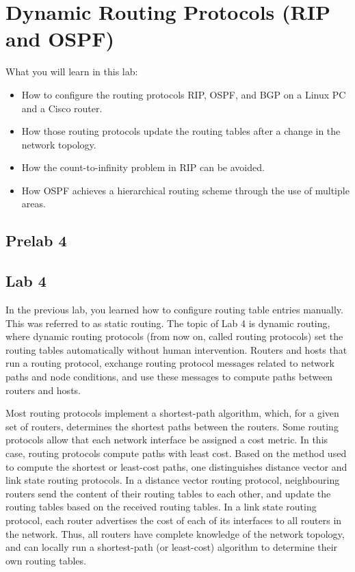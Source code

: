 
\chapter{Dynamic Routing Protocols (RIP and OSPF)}

What you will learn in this lab:
\begin{itemize}
	\item How to configure the routing protocols RIP, OSPF, and BGP on a Linux PC and a Cisco router.
	\item How those routing protocols update the routing tables after a change in the network topology.
	\item How the count-to-infinity problem in RIP can be avoided.
	\item How OSPF achieves a hierarchical routing scheme through the use of multiple areas.
\end{itemize}

\newpage
{}
\section{Prelab 4}\label{sec:prelab4}


\newpage
{}
\section{Lab 4}\label{sec:lab4}

In the previous lab, you learned how to configure routing table entries manually. This was referred to as static routing. The topic of Lab 4 is dynamic routing, where dynamic routing protocols (from now on, called routing protocols) set the routing tables automatically without human intervention. Routers and hosts that run a routing protocol, exchange routing protocol messages related to network paths and node conditions, and use these messages to compute paths between routers and hosts.

Most routing protocols implement a shortest-path algorithm, which, for a given set of routers, determines the shortest paths between the routers. Some routing protocols allow that each network interface be assigned a cost metric. In this case, routing protocols compute paths with least cost. Based on the method used to compute the shortest or least-cost paths, one distinguishes distance vector and link state routing protocols. In a distance vector routing protocol, neighbouring routers send the content of their routing tables to each other, and update the routing tables based on the received routing tables. In a link state routing protocol, each router advertises the cost of each of its interfaces to all routers in the network. Thus, all routers have complete knowledge of the network topology, and can locally run a shortest-path (or least-cost) algorithm to determine their own routing tables.

